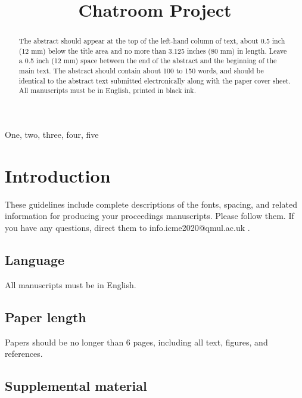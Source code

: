 \documentclass{article}
\begin{document}
\sloppy

\def\x{{\mathbf x}}
\def\L{{\cal L}}


\title{Chatroom Project}
%
\address{}


\maketitle


%
\begin{abstract}
The abstract should appear at the top of the left-hand column of text, about 0.5 inch (12 mm) below the title area and no more than 3.125 inches (80 mm) in length.  Leave a 0.5 inch (12 mm) space between the end of the abstract and the beginning of the main text.  The abstract should contain about 100 to 150 words, and should be identical to the abstract text submitted electronically along with the paper cover sheet.  All manuscripts must be in English, printed in black ink.
\end{abstract}
%
\begin{keywords}
One, two, three, four, five
\end{keywords}
%
\section{Introduction}
\label{sec:intro}

These guidelines include complete descriptions of the fonts, spacing, and related information for producing your proceedings manuscripts. Please follow them. If you have any questions, direct them to info.icme2020@qmul.ac.uk .

\subsection{Language}

All manuscripts must be in English.

\subsection{Paper length}

Papers should be no longer than 6 pages, including all text, figures, and references.

\subsection{Supplemental material}
\end{document}
